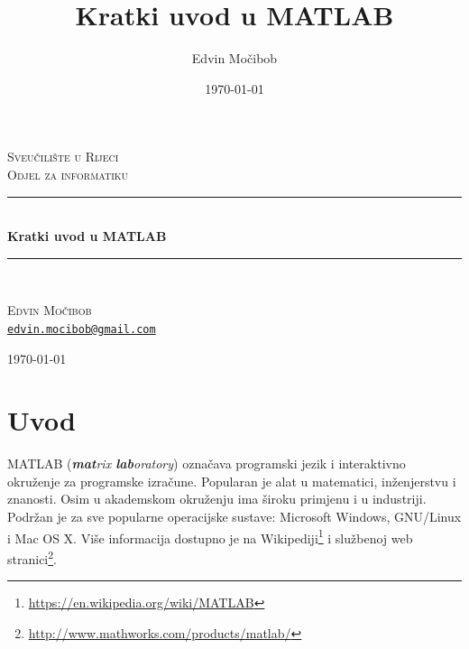 \documentclass[a4paper, 10pt]{article}
\title{Kratki uvod u MATLAB}
\author{Edvin Močibob}
\date{\today}
\newcommand{\eng}[1]{\emph{#1}} %
\begin{document}

\begin{titlepage}
\newcommand{\HRule}{\rule{\linewidth}{0.5mm}}
\begin{center}

\textsc{\LARGE Sveučilište u Rijeci}\\[0.5cm]
\textsc{\Large Odjel za informatiku}\\[2.5cm]

\HRule \\[0.4cm]
{\huge \bfseries Kratki uvod u MATLAB}\\[0.1cm]

\HRule \\[1.5cm]

\begin{minipage}{0.5\textwidth}
	\begin{center}
		\large
		\textsc{\Large Edvin Močibob}\\[0.1cm]
		\href{mailto:edvin.mocibob@gmail.com}{\nolinkurl{edvin.mocibob@gmail.com}}
	\end{center}
\end{minipage}

\vfill
{\large \today}
\end{center}
\end{titlepage}


\tableofcontents
\clearpage


\section*{Uvod}

MATLAB (\eng{\textbf{mat}rix \textbf{lab}oratory}) označava programski jezik i interaktivno okruženje za  programske izračune.
Popularan je alat u matematici, inženjerstvu i znanosti.
Osim u akademskom okruženju ima široku primjenu i u industriji.
Podržan je za sve popularne operacijske sustave: Microsoft Windows, GNU/Linux i Mac OS X.
Više informacija dostupno je na Wikipediji\footnote{\url{https://en.wikipedia.org/wiki/MATLAB}} i službenoj web stranici\footnote{\url{http://www.mathworks.com/products/matlab/}}.
\end{document}
